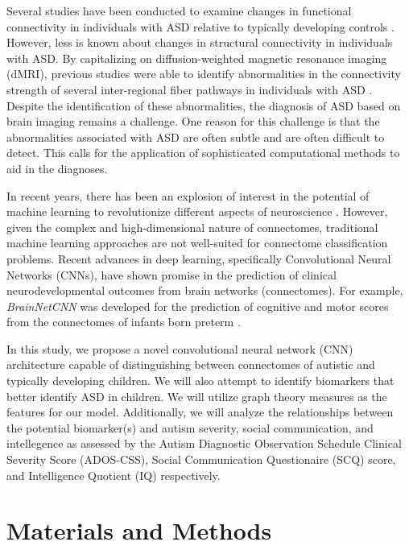 \documentclass[10pt,conference]{IEEEtran}
\begin{document}
Several studies have been conducted to examine changes in functional connectivity in 
individuals with ASD relative to typically developing controls \cite{Lau.2019, Williams.2013}. 
However, less is known about changes in structural connectivity in individuals with ASD. 
By capitalizing on diffusion-weighted magnetic resonance imaging (dMRI), previous studies 
were able to identify abnormalities in the connectivity strength of several inter-regional 
fiber pathways in individuals with ASD \cite{dAlBbis.2018}. Despite the identification of 
these abnormalities, the diagnosis of ASD based on brain imaging remains a challenge. 
One reason for this challenge is that the abnormalities associated with ASD are often 
subtle and are often difficult to detect. This calls for the application of sophisticated 
computational methods to aid in the diagnoses.

In recent years, there has been an explosion of interest in the potential of machine 
learning to revolutionize different aspects of neuroscience \cite{Abos.2017,Vogt.2018}. 
However, given the complex and high-dimensional nature of connectomes, traditional 
machine learning approaches are not well-suited for connectome classification problems. 
Recent advances in deep learning, specifically Convolutional Neural Networks (CNNs), have 
shown promise in the prediction of clinical neurodevelopmental outcomes from brain 
networks (connectomes). For example, \textit{BrainNetCNN} was developed for the 
prediction of cognitive and motor scores from the connectomes of infants born preterm 
\cite{Kawahara.2017}.

In this study, we propose a novel convolutional neural network (CNN) architecture capable 
of distinguishing between connectomes of autistic and typically developing children. We 
will also attempt to identify biomarkers that better identify ASD in children. We will 
utilize graph theory measures as the features for our model. Additionally, we will
analyze the relationships between the potential biomarker(s) and autism severity, social
communication, and intellegence as assessed by the Autism Diagnostic Observation Schedule
Clinical Severity Score (ADOS-CSS), Social Communication Questionaire (SCQ) score, and
Intelligence Quotient (IQ) respectively.


\section{Materials and Methods}
\end{document}
